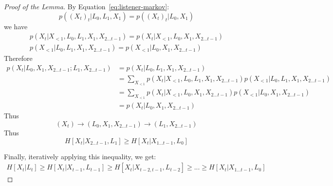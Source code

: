 \documentclass[11pt,letterpaper]{article}
\begin{document}
	\begin{proof}[Proof of the Lemma]

By Equation~\ref{eq:listener-markov}:
	\begin{equation}
p((X_{t})_t| L_0, L_1, X_1)   = p((X_{t})_t| L_0, X_1)
	\end{equation}
we have
	\begin{align*}
p(X_t|X_{<1}, L_0, L_1, X_1, X_{2 \dots t-1}) = p(X_t|X_{<1}, L_0,  X_1, X_{2 \dots t-1}) \\
p(X_{<1}| L_0, L_1, X_1, X_{2 \dots t-1})   = p(X_{<1}| L_0, X_1, X_{2 \dots t-1})
	\end{align*}
Therefore
\begin{align*}
p(X_t|L_0, X_1, X_{2 \dots t-1}; L_1, X_{2 \dots t-1}) & = p(X_t|L_0, L_1, X_1, X_{2 \dots t-1}) \\
& = \sum_{X_{<1}} p(X_t|X_{<1}, L_0, L_1, X_1, X_{2 \dots t-1}) p(X_{<1}| L_0, L_1, X_1, X_{2 \dots t-1}) \\
&= \sum_{X_{<1}} p(X_t|X_{<1}, L_0,  X_1, X_{2 \dots t-1}) p(X_{<1}| L_0, X_1, X_{2 \dots t-1}) \\
&= p(X_t|L_0,  X_1, X_{2 \dots t-1}) 
\end{align*}
Thus
\begin{equation}
(X_t) \rightarrow (L_0, X_1, X_{2 \dots t-1})   \rightarrow   (L_1, X_{2 \dots t-1})
\end{equation}
Thus
	\begin{equation}
H[X_t| X_{2 \dots t-1}, L_{1}] \geq H[X_t|X_{1 \dots t-1}, L_0]
	\end{equation}

Finally, iteratively applying this inequality, we get:
		\begin{align*}
		H[X_t | L_t] \geq H[X_t| X_{t-1}, L_{t-1}] \geq H[X_t| X_{t-2, t-1}, L_{t-2}] \geq ... \geq H[X_t|X_{1 \dots t-1}, L_0]
		\end{align*}

	\end{proof}
	
\end{document}
